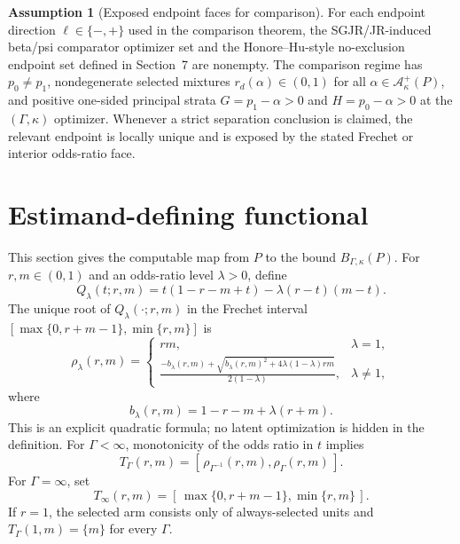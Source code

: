 \documentclass[11pt]{article}
\theoremstyle{definition}
\newtheorem{assumption}{Assumption}
\theoremstyle{plain}
\theoremstyle{remark}
\begin{document}
\begin{assumption}[Exposed endpoint faces for comparison]\label{ass:exposed-endpoints}
For each endpoint direction \(\ell\in\{-,+\}\) used in the comparison theorem,
the SGJR/JR-induced beta/psi comparator optimizer set and the
Honore--Hu-style no-exclusion endpoint set defined in Section~7 are nonempty.
The comparison regime has \(p_0\ne p_1\), nondegenerate selected mixtures
\(r_d(\alpha)\in(0,1)\) for all \(\alpha\in\mathcal A_\kappa^+(P)\), and
positive one-sided principal strata \(G=p_1-\alpha>0\) and
\(H=p_0-\alpha>0\) at the \((\Gamma,\kappa)\) optimizer.  Whenever a strict
separation conclusion is claimed, the relevant endpoint is locally unique and
is exposed by the stated Frechet or interior odds-ratio face.
\end{assumption}

\section{Estimand-defining functional}
This section gives the computable map from \(P\) to the bound
\(B_{\Gamma,\kappa}(P)\).  For \(r,m\in(0,1)\) and an odds-ratio level
\(\lambda>0\), define
\[
  Q_\lambda(t;r,m)
  =
  t(1-r-m+t)-\lambda(r-t)(m-t).
\]
The unique root of \(Q_\lambda(\cdot;r,m)\) in the Frechet interval
\([\max\{0,r+m-1\},\min\{r,m\}]\) is
\[
  \rho_\lambda(r,m)
  =
  \begin{cases}
    rm, & \lambda=1,\\[0.5em]
    \displaystyle
    \frac{-b_\lambda(r,m)+
      \sqrt{b_\lambda(r,m)^2+4\lambda(1-\lambda)rm}}
      {2(1-\lambda)}, & \lambda\ne 1,
  \end{cases}
\]
where
\[
  b_\lambda(r,m)=1-r-m+\lambda(r+m).
\]
This is an explicit quadratic formula; no latent optimization is hidden in the
definition.  For \(\Gamma<\infty\), monotonicity of the odds ratio in \(t\)
implies
\[
  T_\Gamma(r,m)=
  [\,\rho_{\Gamma^{-1}}(r,m),\rho_{\Gamma}(r,m)\,].
\]
For \(\Gamma=\infty\), set
\[
  T_\infty(r,m)=
  [\,\max\{0,r+m-1\},\min\{r,m\}\,].
\]
If \(r=1\), the selected arm consists only of always-selected units and
\(T_\Gamma(1,m)=\{m\}\) for every \(\Gamma\).
\end{document}
